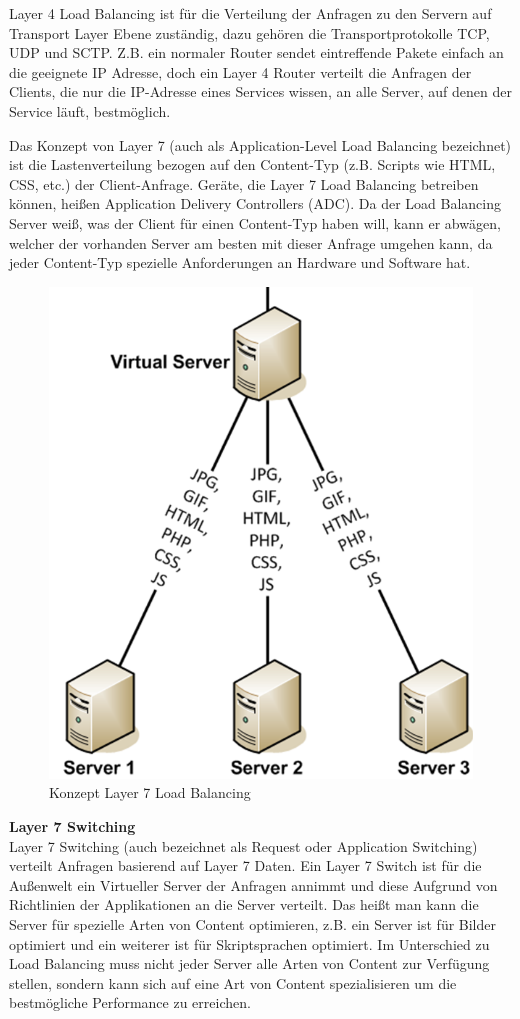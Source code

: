 Layer 4 Load Balancing ist für die Verteilung der Anfragen zu den Servern auf Transport Layer Ebene zuständig, dazu gehören die Transportprotokolle TCP, UDP und SCTP. Z.B. ein normaler Router sendet eintreffende Pakete einfach an die geeignete IP Adresse, doch ein Layer 4 Router verteilt die Anfragen der Clients, die nur die IP-Adresse eines Services wissen, an alle Server,  auf denen der Service läuft, bestmöglich. 

Das Konzept von Layer 7 (auch als Application-Level Load Balancing bezeichnet) ist die Lastenverteilung bezogen auf den Content-Typ (z.B. Scripts wie HTML, CSS, etc.) der Client-Anfrage. Geräte, die Layer 7 Load Balancing betreiben können, heißen Application Delivery Controllers (ADC). Da der Load Balancing Server weiß,  was der Client  für einen Content-Typ haben will, kann er abwägen,  welcher der vorhanden Server am besten mit dieser Anfrage umgehen kann, da jeder Content-Typ spezielle Anforderungen an Hardware und Software hat. \cite{LoadBalancing3}
\pagebreak
\begin{figure}[!h]
	\begin{center}
		\includegraphics[width=0.3\linewidth]{images/loadbalancing4.jpg}
		\caption{Konzept Layer 7 Load Balancing \cite{LoadBalancing2}}
		\label{Konzept Layer 7 Load Balancing}
	\end{center}
\end{figure}

\textbf{Layer 7 Switching} \\
Layer 7 Switching (auch bezeichnet als Request oder Application Switching) verteilt Anfragen basierend auf Layer 7 Daten. Ein Layer 7 Switch ist für die Außenwelt ein Virtueller Server der Anfragen annimmt und diese Aufgrund von Richtlinien der Applikationen an die Server verteilt. Das heißt man kann die Server für spezielle Arten von Content optimieren, z.B. ein Server ist für Bilder optimiert und ein weiterer ist für Skriptsprachen optimiert. Im Unterschied zu Load Balancing muss nicht jeder Server alle Arten von Content zur Verfügung stellen, sondern kann sich auf eine Art von Content spezialisieren um die bestmögliche Performance zu erreichen. \cite{LoadBalancing3}

